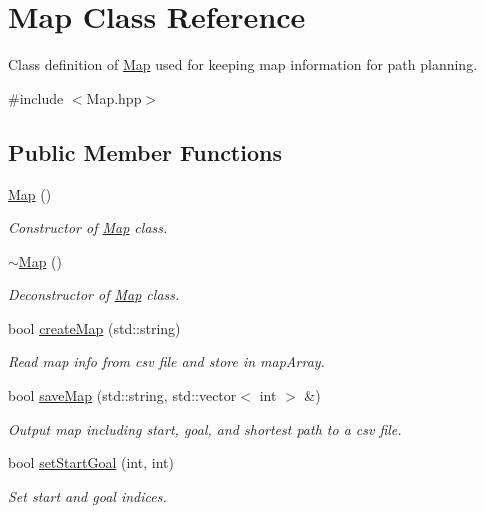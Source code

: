 \hypertarget{classMap}{\section{Map Class Reference}
\label{classMap}
}


Class definition of \hyperlink{classMap}{Map} used for keeping map information for path planning.  




{\ttfamily \#include $<$Map.\-hpp$>$}

\subsection*{Public Member Functions}
\begin{DoxyCompactItemize}
\item 
\hyperlink{classMap_a0f5ad0fd4563497b4214038cbca8b582}{Map} ()
\begin{DoxyCompactList}\small\item\em Constructor of \hyperlink{classMap}{Map} class. \end{DoxyCompactList}\item 
\hyperlink{classMap_aa403fbe09394ccf39747588f5168e3b2}{$\sim$\-Map} ()
\begin{DoxyCompactList}\small\item\em Deconstructor of \hyperlink{classMap}{Map} class. \end{DoxyCompactList}\item 
bool \hyperlink{classMap_a389e4f5c49c1a33e9c0e6c4b2f0605ed}{create\-Map} (std\-::string)
\begin{DoxyCompactList}\small\item\em Read map info from csv file and store in map\-Array. \end{DoxyCompactList}\item 
bool \hyperlink{classMap_a43ce2c046c7908d95e06bd29182ac6bf}{save\-Map} (std\-::string, std\-::vector$<$ int $>$ \&)
\begin{DoxyCompactList}\small\item\em Output map including start, goal, and shortest path to a csv file. \end{DoxyCompactList}\item 
bool \hyperlink{classMap_aa64162f950a1936e1eaf42609e091524}{set\-Start\-Goal} (int, int)
\begin{DoxyCompactList}\small\item\em Set start and goal indices. \end{DoxyCompactList}\item 

\end{DoxyCompactItemize}

